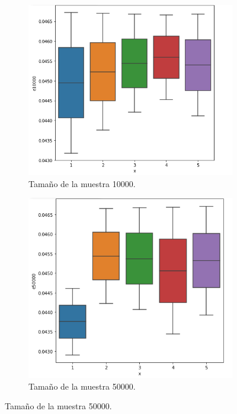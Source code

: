 \documentclass{article}
\begin{document}
\begin{figure}
	\centering
	\begin{subfigure}[b]{0.45\linewidth}
		\includegraphics[width=\linewidth]{e10000.png}
		\caption{Tamaño de la muestra 10000.}
		\label{1}
	\end{subfigure}
		\begin{subfigure}[b]{0.45\linewidth}
		\includegraphics[width=\linewidth]{e50000.png}
		\caption{Tamaño de la muestra 50000.}
		\label{2}
	\end{subfigure}

\end{figure}
\end{document}
